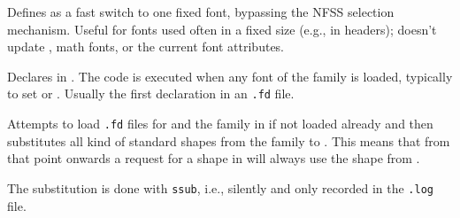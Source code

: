 \documentclass{l3in2edoc}
\begin{document}
\begin{function}[user]
  {
    \DeclareFixedFont
  }
  \begin{syntax}
          
  \end{syntax}
  Defines  as a fast switch to one fixed font, bypassing
  the NFSS selection mechanism. Useful for fonts used often in a fixed
  size (e.g., in headers);  doesn't update
  , math fonts, or the current font attributes.
\end{function}



\begin{function}[user]
  {
    \DeclareFontFamily
  }
  \begin{syntax}
       
  \end{syntax}
  Declares  in . The  code
  is executed when any font of the family is loaded, typically to set
   or . Usually the first declaration in
  an \texttt{.fd} file.
\end{function}



\begin{function}[user]
  {
    \DeclareFontFamilySubstitution
  }
  \begin{syntax}
       
  \end{syntax}
  Attempts to load \texttt{.fd} files for  and the
   family in  if not loaded already
  and then substitutes all kind of standard shapes from the
   family to . This means that from
  that point onwards a request for a shape in  will
  always use the shape from .

  The substitution is done with \texttt{ssub}, i.e., silently and only
  recorded in the \texttt{.log} file.
\end{function}
\end{document}
